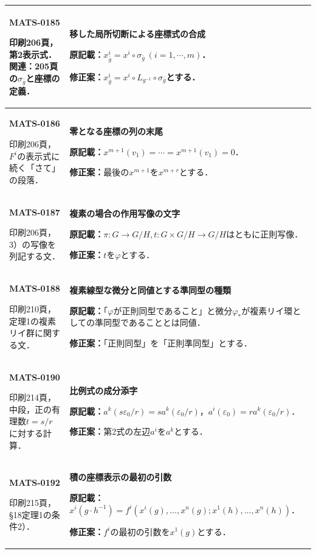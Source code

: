 \documentclass[a4paper,10pt]{ltjsarticle}
\begin{document}
\begin{longtable}{@{}>{\raggedright\arraybackslash}p{.19\linewidth}>{\raggedright\arraybackslash}p{.77\linewidth}@{}}
\hline
\hypertarget{MATS-0185}{}\textbf{MATS-0185}\par 印刷206頁，第2表示式．関連：205頁の$\sigma_{\bar g}$と座標の定義． & \textbf{移した局所切断による座標式の合成}\par\textbf{原記載：}$x^i_{\bar g}=x^i\circ\sigma_{\bar g}\ (i=1,\cdots,m)$．\par\textbf{修正案：}$x^i_{\bar g}=x^i\circ L_{g^{-1}}\circ\sigma_{\bar g}$とする． \\[3pt]
\hline
\hypertarget{MATS-0186}{}\textbf{MATS-0186}\par 印刷206頁，$F^i$の表示式に続く「さて」の段落． & \textbf{零となる座標の列の末尾}\par\textbf{原記載：}$x^{m+1}(v_1)=\cdots=x^{m+1}(v_1)=0$．\par\textbf{修正案：}最後の$x^{m+1}$を$x^{m+r}$とする． \\[3pt]
\hline
\hypertarget{MATS-0187}{}\textbf{MATS-0187}\par 印刷206頁，3）の写像を列記する文． & \textbf{複素の場合の作用写像の文字}\par\textbf{原記載：}$\pi:G\to G/H,t:G\times G/H\to G/H$はともに正則写像．\par\textbf{修正案：}$t$を$\varphi$とする． \\[3pt]
\hline
\hypertarget{MATS-0188}{}\textbf{MATS-0188}\par 印刷210頁，定理1の複素リイ群に関する文． & \textbf{複素線型な微分と同値とする準同型の種類}\par\textbf{原記載：}「$\varphi$が正則同型であること」と微分$\varphi_*$が複素リイ環としての準同型であることとは同値．\par\textbf{修正案：}「正則同型」を「正則準同型」とする． \\[3pt]
\hline
\hypertarget{MATS-0190}{}\textbf{MATS-0190}\par 印刷214頁，中段，正の有理数$t=s/r$に対する計算． & \textbf{比例式の成分添字}\par\textbf{原記載：}$a^k(s\varepsilon_0/r)=s a^k(\varepsilon_0/r)$，$a^i(\varepsilon_0)=r a^k(\varepsilon_0/r)$．\par\textbf{修正案：}第2式の左辺$a^i$を$a^k$とする． \\[3pt]
\hline
\hypertarget{MATS-0192}{}\textbf{MATS-0192}\par 印刷215頁，§18定理1の条件2）． & \textbf{積の座標表示の最初の引数}\par\textbf{原記載：}$x^i(g\cdot h^{-1})=f^i(x^i(g),\ldots,x^n(g);x^1(h),\ldots,x^n(h))$．\par\textbf{修正案：}$f^i$の最初の引数を$x^1(g)$とする． \\[3pt]

\end{longtable}
\end{document}
